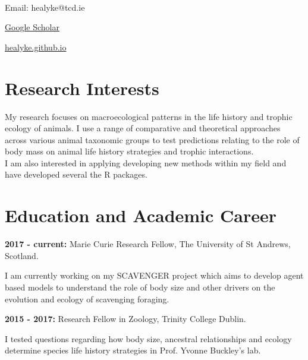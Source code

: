 \documentclass[10pt,a4paper]{article}
\newcommand\textbox[1]{%
  \parbox{.333\textwidth}{#1}%
}
\begin{document}
\par{\smallskip\par}

\large{}\\
\bigskip

\noindent\textbox{Email: healyke@tcd.ie\hfill}\textbox{\hfil \href{http://scholar.google.com/citations?user=5Kb9u8EAAAAJ}{Google Scholar} \hfil}\textbox{\hfill \href{http://healyke.github.io}{healyke.github.io}}


\bigskip


\section{\textbf{Research Interests}}
\raggedright	
My research focuses on macroecological patterns in the life history and trophic ecology of animals. I use a range of comparative and theoretical approaches across various animal taxonomic groups to test predictions relating to the role of body mass on animal life history strategies and trophic interactions.\\ 
I am also interested in applying  developing new methods within my field and have developed several the R packages.
\bigskip



\section{\textbf{Education and Academic Career}}

\raggedright	
\textbf{2017 - current:} Marie Curie Research Fellow, The University of St Andrews, Scotland.
 \smallskip
\par{\fontsize{10.5}{10} I am currently working on my SCAVENGER project which aims to develop agent based models to understand the role of body size and other drivers on the evolution and ecology of scavenging foraging.
\bigskip}

\raggedright	
\textbf{2015 - 2017:} Research Fellow in Zoology, Trinity College Dublin.
 \smallskip
\par{\fontsize{10.5}{10} I tested questions regarding how body size, ancestral relationships and ecology determine species life history strategies in Prof. Yvonne Buckley's lab.\bigskip}
\end{document}
